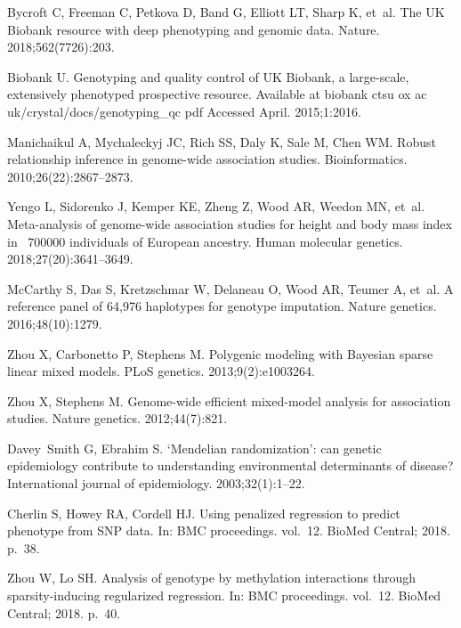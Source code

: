 \documentclass[10pt,letterpaper]{article}
\begin{document}
\begin{thebibliography}{10}
	Bycroft C, Freeman C, Petkova D, Band G, Elliott LT, Sharp K, et~al.
	\newblock The UK Biobank resource with deep phenotyping and genomic data.
	\newblock Nature. 2018;562(7726):203.

	Biobank U.
	\newblock Genotyping and quality control of UK Biobank, a large-scale,
	extensively phenotyped prospective resource.
	\newblock Available at biobank ctsu ox ac uk/crystal/docs/genotyping\_qc pdf
	Accessed April. 2015;1:2016.

	Manichaikul A, Mychaleckyj JC, Rich SS, Daly K, Sale M, Chen WM.
	\newblock Robust relationship inference in genome-wide association studies.
	\newblock Bioinformatics. 2010;26(22):2867--2873.

	Yengo L, Sidorenko J, Kemper KE, Zheng Z, Wood AR, Weedon MN, et~al.
	\newblock Meta-analysis of genome-wide association studies for height and body
	mass index in~ 700000 individuals of European ancestry.
	\newblock Human molecular genetics. 2018;27(20):3641--3649.

	McCarthy S, Das S, Kretzschmar W, Delaneau O, Wood AR, Teumer A, et~al.
	\newblock A reference panel of 64,976 haplotypes for genotype imputation.
	\newblock Nature genetics. 2016;48(10):1279.

	Zhou X, Carbonetto P, Stephens M.
	\newblock Polygenic modeling with Bayesian sparse linear mixed models.
	\newblock PLoS genetics. 2013;9(2):e1003264.

	Zhou X, Stephens M.
	\newblock Genome-wide efficient mixed-model analysis for association studies.
	\newblock Nature genetics. 2012;44(7):821.

	Davey~Smith G, Ebrahim S.
	\newblock ‘Mendelian randomization’: can genetic epidemiology contribute to
	understanding environmental determinants of disease?
	\newblock International journal of epidemiology. 2003;32(1):1--22.

	Cherlin S, Howey RA, Cordell HJ.
	\newblock Using penalized regression to predict phenotype from SNP data.
	\newblock In: BMC proceedings. vol.~12. BioMed Central; 2018. p.~38.

	Zhou W, Lo SH.
	\newblock Analysis of genotype by methylation interactions through
	sparsity-inducing regularized regression.
	\newblock In: BMC proceedings. vol.~12. BioMed Central; 2018. p.~40.


\end{thebibliography}
\end{document}

